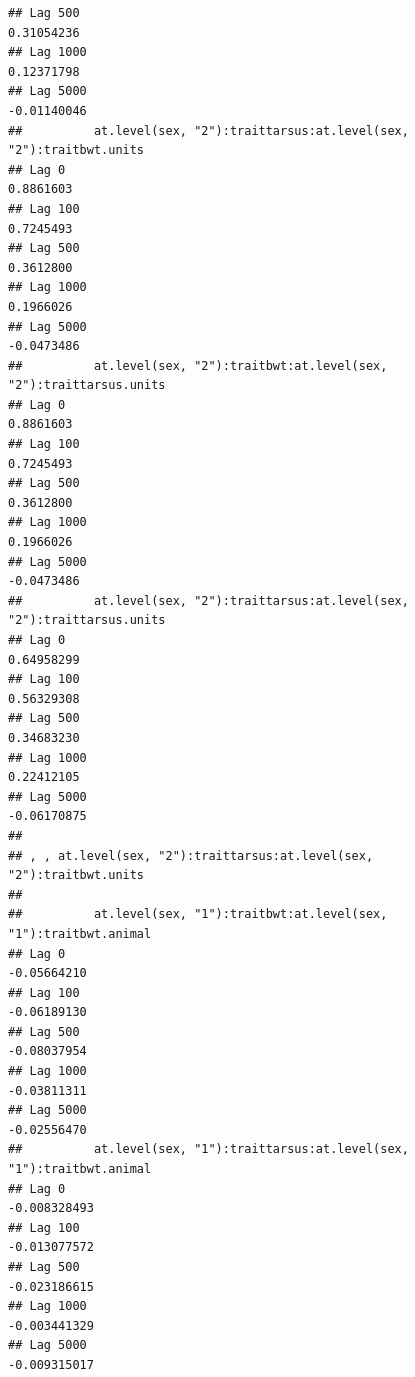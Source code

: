 \documentclass[
  12pt,
]{book}
\begin{document}
\begin{verbatim}
## Lag 500                                                     0.31054236
## Lag 1000                                                    0.12371798
## Lag 5000                                                   -0.01140046
##          at.level(sex, "2"):traittarsus:at.level(sex, "2"):traitbwt.units
## Lag 0                                                           0.8861603
## Lag 100                                                         0.7245493
## Lag 500                                                         0.3612800
## Lag 1000                                                        0.1966026
## Lag 5000                                                       -0.0473486
##          at.level(sex, "2"):traitbwt:at.level(sex, "2"):traittarsus.units
## Lag 0                                                           0.8861603
## Lag 100                                                         0.7245493
## Lag 500                                                         0.3612800
## Lag 1000                                                        0.1966026
## Lag 5000                                                       -0.0473486
##          at.level(sex, "2"):traittarsus:at.level(sex, "2"):traittarsus.units
## Lag 0                                                             0.64958299
## Lag 100                                                           0.56329308
## Lag 500                                                           0.34683230
## Lag 1000                                                          0.22412105
## Lag 5000                                                         -0.06170875
## 
## , , at.level(sex, "2"):traittarsus:at.level(sex, "2"):traitbwt.units
## 
##          at.level(sex, "1"):traitbwt:at.level(sex, "1"):traitbwt.animal
## Lag 0                                                       -0.05664210
## Lag 100                                                     -0.06189130
## Lag 500                                                     -0.08037954
## Lag 1000                                                    -0.03811311
## Lag 5000                                                    -0.02556470
##          at.level(sex, "1"):traittarsus:at.level(sex, "1"):traitbwt.animal
## Lag 0                                                         -0.008328493
## Lag 100                                                       -0.013077572
## Lag 500                                                       -0.023186615
## Lag 1000                                                      -0.003441329
## Lag 5000                                                      -0.009315017

\end{verbatim}
\end{document}
